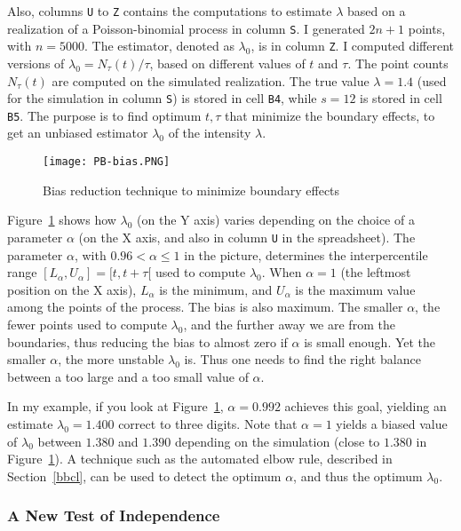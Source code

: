 \documentclass[10pt]{article}
\begin{document}
Also, columns \texttt{U} to \texttt{Z} contains the computations to estimate $\lambda$ based on a realization of a Poisson-binomial process in column \texttt{S}. I generated $2n+1$ points, with $n=\num{5000}$.
The estimator,
 denoted as $\lambda_0$, is in column \texttt{Z}. I computed different versions of $\lambda_0=N_\tau(t)/\tau$, based on different values of $t$ and $\tau$. The point counts
 $N_\tau(t)$ are computed on the simulated realization. The true value $\lambda=1.4$ (used for the simulation in column \texttt{S}) is stored in cell \texttt{B4}, while $s=12$ is stored in cell \texttt{B5}. The purpose is to find optimum $t,\tau$ that minimize the boundary effects, to get an unbiased estimator $\lambda_0$ of the intensity $\lambda$.

\begin{figure}[H]
\centering
\texttt{[image: PB-bias.PNG]}
\caption{Bias reduction technique to minimize boundary effects}
\label{fig:pbbias}
\end{figure}

Figure~\ref{fig:pbbias} shows how $\lambda_0$ (on the Y axis) varies depending on the choice of a parameter $\alpha$ (on the X axis, and also in column \texttt{U} in the spreadsheet). The parameter
$\alpha$, with $0.96<\alpha\leq 1$ in the picture,
determines the interpercentile range $[L_\alpha,U_\alpha] = [t, t+\tau[$ used to compute $\lambda_0$. When $\alpha=1$ (the leftmost position on the X axis),
 $L_\alpha$ is the minimum, and $U_\alpha$ is the maximum value among the points of the process. The bias is also maximum. The smaller $\alpha$, the fewer points used to compute $\lambda_0$, and the further away we are from the boundaries, thus reducing the bias to almost zero if $\alpha$ is small enough. Yet the smaller $\alpha$, the more unstable $\lambda_0$ is. Thus one needs to find the right balance between a too large and a too small value of $\alpha$.

In my example, if you look at Figure~\ref{fig:pbbias}, $\alpha=0.992$ achieves this goal, yielding an estimate $\lambda_0=1.400$ correct to three digits. Note that $\alpha=1$ yields a biased value of $\lambda_0$ between $1.380$ and $1.390$ depending on the simulation
 (close to $1.380$ in Figure~\ref{fig:pbbias}). A technique such as the automated \textcolor{index}{elbow rule}, described in Section~\ref{bbcl}, can be used to detect the optimum $\alpha$, and thus the optimum $\lambda_0$.


\subsubsection{A New Test of Independence}\label{indep1}
\end{document}
